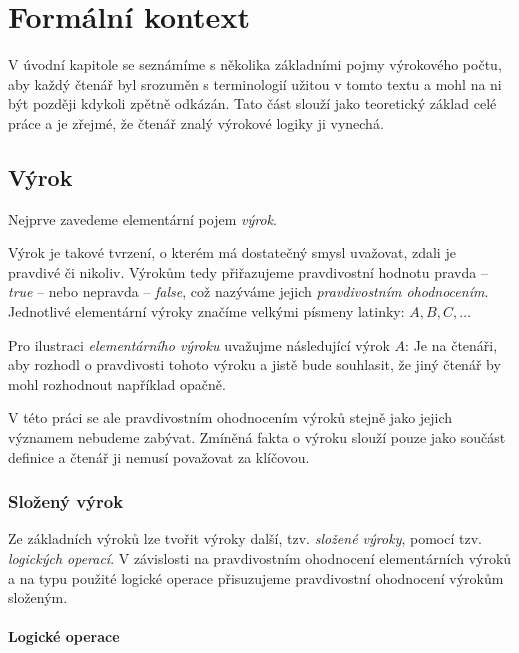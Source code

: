 \documentclass[thesis=B,czech,hidelinks]{FITthesis}[2012/06/26]
\begin{document}
%
%
%

\chapter{Formální kontext}

V úvodní kapitole se seznámíme s několika základními pojmy výrokového počtu, aby každý čtenář byl srozuměn s terminologií užitou v tomto textu a mohl na ni být později kdykoli zpětně odkázán. Tato část slouží jako teoretický základ celé práce a je zřejmé, že čtenář znalý výrokové logiky ji vynechá.

\section{Výrok}

Nejprve zavedeme elementární pojem \emph{výrok}.

Výrok je takové tvrzení, o kterém má dostatečný smysl uvažovat, zdali je pravdivé či nikoliv. Výrokům tedy přiřazujeme pravdivostní hodnotu pravda -- \emph{true} -- nebo nepravda -- \emph{false}, což nazýváme jejich \emph{pravdivostním ohodnocením}. Jednotlivé elementární výroky značíme velkými písmeny latinky: $A, B, C, \ldots$

\begin{ex}
Pro ilustraci \emph{elementárního výroku} uvažujme následující výrok $A$:  Je na čtenáři, aby rozhodl o pravdivosti tohoto výroku a jistě bude souhlasit, že jiný čtenář by mohl rozhodnout například opačně.
\end{ex}

V této práci se ale pravdivostním ohodnocením výroků stejně jako jejich významem nebudeme zabývat. Zmíněná fakta o výroku slouží pouze jako součást definice a čtenář ji nemusí považovat za klíčovou.

\subsection{Složený výrok}

Ze základních výroků lze tvořit výroky další, tzv. \emph{složené výroky}, pomocí tzv. \emph{logických operací}. V závislosti na pravdivostním ohodnocení elementárních výroků a na typu použité logické operace přisuzujeme pravdivostní ohodnocení výrokům složeným.

\subsubsection{Logické operace}
\end{document}
